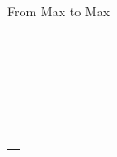 \documentclass{article}
\begin{document}
\begin{multicols}{2}
    From Max to Max

    \vspace{0.5cm}
    \begin{tabular}{|c|}
        \hline \hspace{2cm} \\ \hline \hspace{2cm} \\ \hline \hspace{2cm} \\ \hline \hspace{2cm} \\ \hline \hspace{2cm} \\ \hline \hspace{2cm} \\ \hline \hspace{2cm} \\ \hline \hspace{2cm} \\ \hline \hspace{2cm} \\ \hline \hspace{2cm} \\ \hline \hspace{2cm} \\ \hline \hspace{2cm} \\ \hline \hspace{2cm} \\ \hline \hspace{2cm} \\ \hline \hspace{2cm} \\ \hline \hspace{2cm} \\ \hline \hspace{2cm} \\ \hline \hspace{2cm} \\ \hline \hspace{2cm} \\ \hline \hspace{2cm} \\ \hline \hspace{2cm} \\ \hline \hspace{2cm} \\ \hline \hspace{2cm} \\ \hline \hspace{2cm} \\ \hline \hspace{2cm} \\ \hline
    \end{tabular}


\end{multicols}
\end{document}
